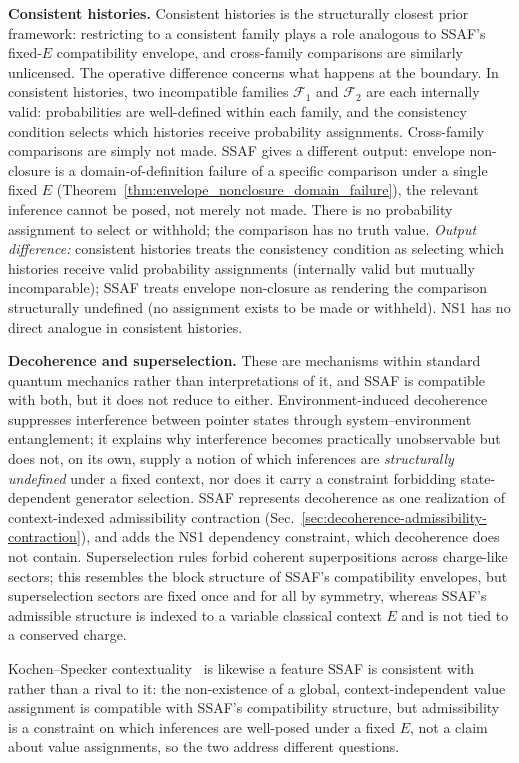 \documentclass[aps,prx,onecolumn,11pt]{revtex4-2}
\theoremstyle{plain}
\theoremstyle{definition}
\theoremstyle{remark}
\begin{document}
\textbf{Consistent histories.}  Consistent histories is the structurally closest prior framework: restricting to a consistent family plays a role analogous to SSAF's fixed-$E$ compatibility envelope, and cross-family comparisons are similarly unlicensed. The operative difference concerns what happens at the boundary. In consistent histories, two incompatible families $\mathcal{F}_1$ and $\mathcal{F}_2$ are each internally valid: probabilities are well-defined within each family, and the consistency condition selects which histories receive probability assignments. Cross-family comparisons are simply not made. SSAF gives a different output: envelope non-closure is a domain-of-definition failure of a specific comparison under a single fixed $E$ (Theorem~\ref{thm:envelope_nonclosure_domain_failure}), the relevant inference cannot be posed, not merely not made. There is no probability assignment to select or withhold; the comparison has no truth value. \emph{Output difference:} consistent histories treats the consistency condition as selecting which histories receive valid probability assignments (internally valid but mutually incomparable); SSAF treats envelope non-closure as rendering the comparison structurally undefined (no assignment exists to be made or withheld). NS1 has no direct analogue in consistent histories.

\textbf{Decoherence and superselection.}  These are mechanisms within
standard quantum mechanics rather than interpretations of it, and SSAF
is compatible with both, but it does not reduce to either. Environment-induced
decoherence suppresses interference between pointer states through
system--environment entanglement; it explains why interference becomes
practically unobservable but does not, on its own, supply a notion of which
inferences are \emph{structurally undefined} under a fixed context, nor does
it carry a constraint forbidding state-dependent generator selection. SSAF
represents decoherence as one realization of context-indexed admissibility
contraction (Sec.~\ref{sec:decoherence-admissibility-contraction}), and adds the NS1
dependency constraint, which decoherence does not contain. Superselection
rules forbid coherent superpositions across charge-like sectors; this
resembles the block structure of SSAF's compatibility envelopes, but
superselection sectors are fixed once and for all by symmetry, whereas
SSAF's admissible structure is indexed to a variable classical context $E$
and is not tied to a conserved charge.

Kochen--Specker contextuality~\cite{KochenSpecker1967, AbramskyBrandenburger2011} is likewise a feature
SSAF is consistent with rather than a rival to it: the non-existence of a
global, context-independent value assignment is compatible with SSAF's
compatibility structure, but admissibility is a constraint on which inferences
are well-posed under a fixed $E$, not a claim about value assignments, so the
two address different questions.
\end{document}
